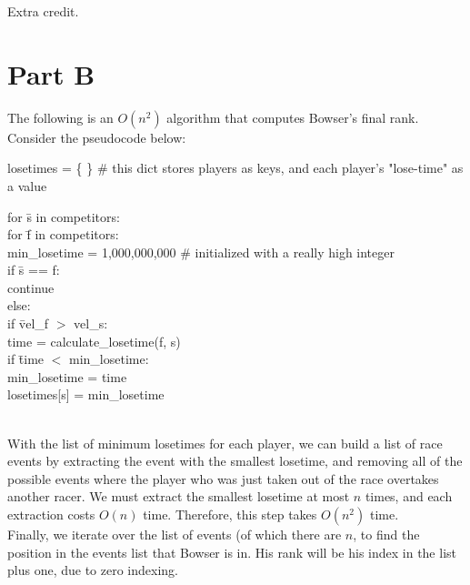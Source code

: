 \documentclass[12pt,twoside]{article}
\begin{document}
\begin{problems}
\begin{problemparts}
\problempart Extra credit.
\end{problemparts}




\section*{Part B}

\problem
\begin{problemparts}
\problempart The following is an $O(n^2)$ algorithm that computes Bowser's final rank. Consider the pseudocode below:
\bigskip

losetimes =  \{ \}  \# this dict stores players as keys, and each player's "lose-time" as a value

\begin{tabbing}
for \= s in competitors: \\
	\> for \= f in competitors: \\
		\>\> min\_losetime = 1,000,000,000  \# initialized with a really high integer \\
		\>\> if \= s == f:\\
			\>\>\> continue\\
		\>\>else:\\
			\>\>\>if \=vel\_f $>$ vel\_s:\\
				\>\>\>\>time = calculate\_losetime(f, s)\\
				\>\>\>\>if \= time $<$ min\_losetime:\\
					\>\>\>\>\>min\_losetime = time\\
	\>losetimes[s] = min\_losetime\\
	\\
	\smallskip

\end{tabbing}

With the list of minimum losetimes for each player, we can build a list of race events by extracting the event with the smallest losetime, and removing all of the possible events where the player who was just taken out of the race overtakes another racer. We must extract the smallest losetime at most $n$ times, and each extraction costs $O(n)$ time. Therefore, this step takes $O(n^2)$ time. \\

Finally, we iterate over the list of events (of which there are $n$, to find the position in the events list that Bowser is in. His rank will be his index in the list plus one, due to zero indexing. \\


\end{problemparts}
\end{problems}
\end{document}
